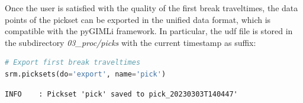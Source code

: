 \documentclass[a4paper,fleqn]{cas-sc}
\begin{document}
Once the user is satisfied with the quality of the first break traveltimes, the data points of the pickset can be exported in the unified data format, which is compatible with the pyGIMLi framework. In particular, the udf file is stored in the subdirectory \textit{03\_proc/picks} with the current timestamp as suffix:
\begin{lstlisting}[language=Python, firstnumber=22]
# Export first break traveltimes
srm.picksets(do='export', name='pick')
\end{lstlisting}
\begin{footnotesize}
\begin{verbatim}
INFO    : Pickset 'pick' saved to pick_20230303T140447'
\end{verbatim}
\end{footnotesize}
\end{document}
